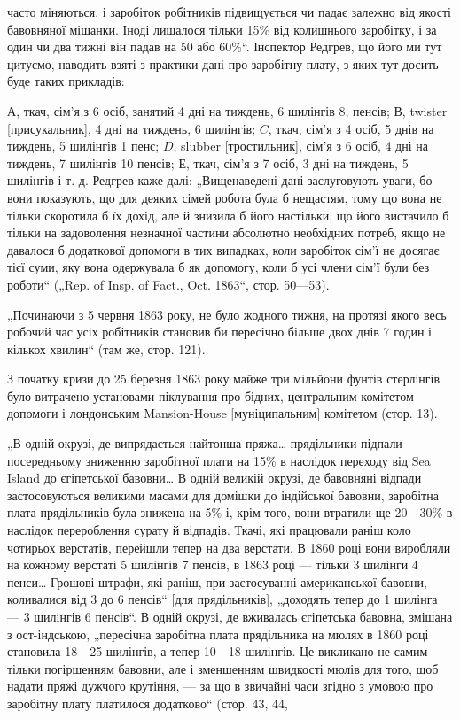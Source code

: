 \parcont{}  %
часто міняються, і заробіток робітників підвищується чи падає
залежно від якості бавовняної мішанки. Іноді лишалося тільки
15\% від колишнього заробітку, і за один чи два тижні він
падав на 50 або 60\%“. Інспектор Редгрев, що його ми тут
цитуємо, наводить взяті з практики дані про заробітну плату,
з яких тут досить буде таких прикладів:

$А$, ткач, сім’я з 6 осіб, занятий 4 дні на тиждень, 6 шилінгів
8, пенсів; $В$, twister [присукальник], 4 дні на тиждень, 6 шилінгів;
$C$, ткач, сім’я з 4 осіб, 5 днів на тиждень, 5 шилінгів
1 пенс; $D$, slubber [тростильник], сім’я з 6 осіб, 4 дні на тиждень,
7 шилінгів 10 пенсів; $Е$, ткач, сім’я з 7 осіб, 3 дні на
тиждень, 5 шилінгів і т. д. Редгрев каже далі: „Вищенаведені
дані заслуговують уваги, бо вони показують, що для деяких
сімей робота була б нещастям, тому що вона не тільки скоротила
б їх дохід, але й знизила б його настільки, що його вистачило
б тільки на задоволення незначної частини абсолютно
необхідних потреб, якщо не давалося б додаткової допомоги
в тих випадках, коли заробіток сім’ї не досягає тієї суми, яку
вона одержувала б як допомогу, коли б усі члени сім’ї були
без роботи“ („Rep. of Insp. of Fact., Oct. 1863“, стор. 50—53).

„Починаючи з 5 червня 1863 року, не було жодного тижня,
на протязі якого весь робочий час усіх робітників становив би
пересічно більше двох днів 7 годин і кількох хвилин“ (там же,
стор. 121).

З початку кризи до 25 березня 1863 року майже три мільйони
фунтів стерлінгів було витрачено установами піклування
про бідних, центральним комітетом допомоги і лондонським
Mansion-House [муніципальним] комітетом (стор. 13).

„В одній окрузі, де випрядається найтонша пряжа\dots{} прядільники
підпали посередньому зниженню заробітної плати на 15\%
в наслідок переходу від Sea Island до єгіпетської бавовни\dots{}
В одній великій окрузі, де бавовняні відпади застосовуються
великими масами для домішки до індійської бавовни, заробітна
плата прядільників була знижена на 5\% і, крім того, вони
втратили ще 20—30\% в наслідок перероблення сурату й відпадів.
Ткачі, які працювали раніш коло чотирьох верстатів, перейшли
тепер на два верстати. В 1860 році вони виробляли на кожному
верстаті 5 шилінгів 7 пенсів, в 1863 році — тільки 3 шилінги
4 пенси\dots{} Грошові штрафи, які раніш, при застосуванні американської
бавовни, коливалися від 3 до 6 пенсів“ [для прядільників],
„доходять тепер до 1 шилінга — 3 шилінгів 6 пенсів“.
В одній окрузі, де вживалась єгіпетська бавовна, змішана
з ост-індською, „пересічна заробітна плата прядільника на мюлях
в 1860 році становила 18—25 шилінгів, а тепер 10—18 шилінгів.
Це викликано не самим тільки погіршенням бавовни,
але і зменшенням швидкості мюлів для того, щоб надати
пряжі дужчого крутіння, — за що в звичайні часи згідно з умовою
про заробітну плату платилося додатково“ (стор. 43, 44,
\parbreak{}  %
